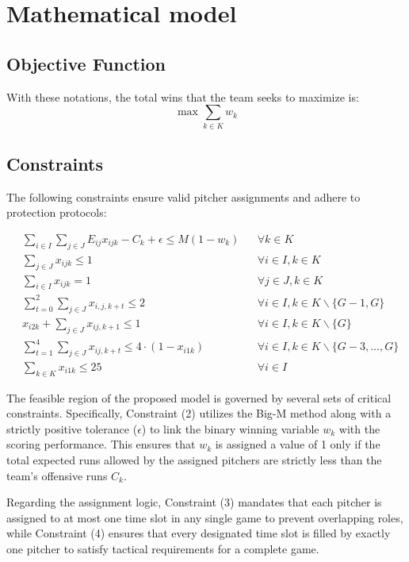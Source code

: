 \documentclass[11pt, a4paper]{article}
\begin{document}
\section{Mathematical model}

\subsection*{Objective Function}
With these notations, the total wins that the team seeks to maximize is:
\begin{equation}
\max \sum_{k\in K}w_{k}
\end{equation}

\subsection*{Constraints}
The following constraints ensure valid pitcher assignments and adhere to protection protocols:

\begin{align}
& \sum_{i\in I}\sum_{j\in J}E_{ij}x_{ijk} - C_{k} + \epsilon \le M(1-w_{k}) && \forall k\in K \\
& \sum_{j\in J}x_{ijk} \le 1 && \forall i\in I, k\in K \\
& \sum_{i\in I}x_{ijk} = 1 && \forall j\in J, k\in K \\
& \sum_{t=0}^{2}\sum_{j\in J}x_{i,j,k+t} \le 2 && \forall i\in I, k\in K\backslash\{G-1,G\} \\
& x_{i2k} + \sum_{j\in J}x_{ij,k+1} \le 1 && \forall i\in I, k\in K\backslash\{G\} \\
& \sum_{t=1}^{4}\sum_{j\in J}x_{ij,k+t} \le 4 \cdot (1 - x_{i1k}) \quad && \forall i\in I, k\in K\backslash\{G-3,...,G\} \\
& \sum_{k\in K}x_{i1k} \le 25 && \forall i\in I
\end{align}


The feasible region of the proposed model is governed by several sets of critical constraints. Specifically, Constraint (2) utilizes the Big-M method along with a strictly positive tolerance ($\epsilon$) to link the binary winning variable $w_k$ with the scoring performance. This ensures that $w_k$ is assigned a value of 1 only if the total expected runs allowed by the assigned pitchers are strictly less than the team's offensive runs $C_k$.

Regarding the assignment logic, Constraint (3) mandates that each pitcher is assigned to at most one time slot in any single game to prevent overlapping roles, while Constraint (4) ensures that every designated time slot is filled by exactly one pitcher to satisfy tactical requirements for a complete game.
\end{document}
